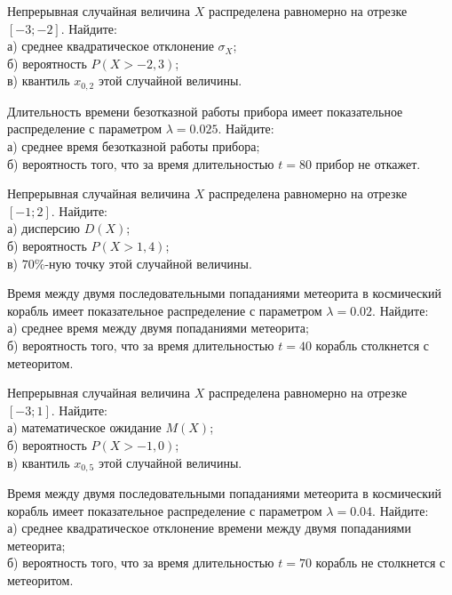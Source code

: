 \vfill

\newpage\setcounter{zad}{0}

\z Непрерывная случайная величина $X$ распределена равномерно на отрезке $[-3; -2]$. Найдите: \\ \quad а) среднее квадратическое отклонение $\sigma_X$; \\ \quad б) вероятность $P(X>-2{,}3)$; \\ \quad в) квантиль $x_{0{,}2}$ этой случайной величины.


\vfill

\z Длительность времени безотказной работы прибора имеет показательное распределение с параметром $\lambda = 0.025$. Найдите: \\ \quad а) среднее время безотказной работы прибора; \\ \quad б) вероятность того, что за время длительностью $t = 80$ прибор не откажет.
 

\vfill

\newpage\setcounter{zad}{0}

\z Непрерывная случайная величина $X$ распределена равномерно на отрезке $[-1; 2]$. Найдите: \\ \quad а) дисперсию $D(X)$; \\ \quad б) вероятность $P(X>1{,}4)$; \\ \quad в) $70\%$-ную точку этой случайной величины.


\vfill

\z Время между двумя последовательными попаданиями метеорита в космический корабль имеет показательное распределение с параметром $\lambda = 0.02$. Найдите: \\ \quad а) среднее время между двумя попаданиями метеорита; \\ \quad б) вероятность того, что за время длительностью $t = 40$ корабль  столкнется с метеоритом.
 

\vfill

\newpage\setcounter{zad}{0}

\z Непрерывная случайная величина $X$ распределена равномерно на отрезке $[-3; 1]$. Найдите: \\ \quad а) математическое ожидание $M(X)$; \\ \quad б) вероятность $P(X>-1{,}0)$; \\ \quad в) квантиль $x_{0{,}5}$ этой случайной величины.


\vfill

\z Время между двумя последовательными попаданиями метеорита в космический корабль имеет показательное распределение с параметром $\lambda = 0.04$. Найдите: \\ \quad а) среднее квадратическое отклонение времени между двумя попаданиями метеорита; \\ \quad б) вероятность того, что за время длительностью $t = 70$ корабль не столкнется с метеоритом.
 

